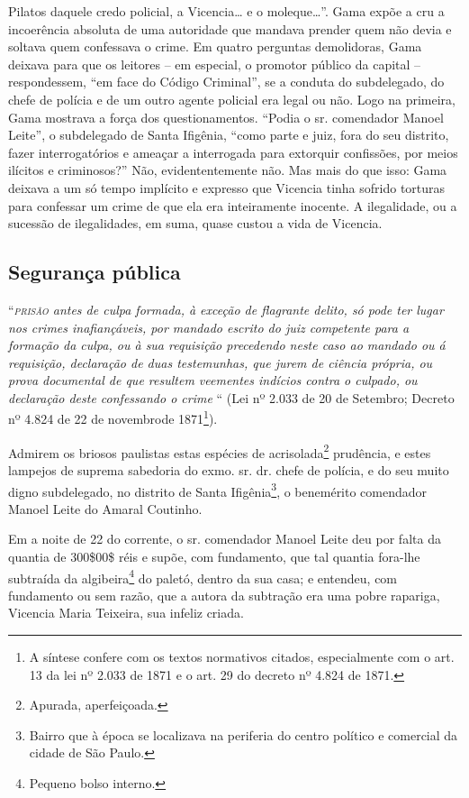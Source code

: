 {\begin{flushright}
\begin{didascalia}
{Pilatos daquele credo policial, a Vicencia\ldots{} e o moleque\ldots{}''. Gama
expõe a cru a incoerência absoluta de uma autoridade que mandava prender
quem não devia e soltava quem confessava o crime. Em quatro perguntas
demolidoras, Gama deixava para que os leitores -- em especial, o
promotor público da capital -- respondessem, ``em face do Código
Criminal'', se a conduta do subdelegado, do chefe de polícia e de um
outro agente policial era legal ou não. Logo na primeira, Gama mostrava
a força dos questionamentos. ``Podia o sr. comendador Manoel Leite'', o
subdelegado de Santa Ifigênia, ``como parte e juiz, fora do seu distrito,
fazer interrogatórios e ameaçar a interrogada para extorquir confissões,
por meios ilícitos e criminosos?'' Não, evidententemente não. Mas mais do
que isso: Gama deixava a um só tempo implícito e expresso que Vicencia
tinha sofrido torturas para confessar um crime de que ela era
inteiramente inocente. A ilegalidade, ou a sucessão de ilegalidades, em
suma, quase custou a vida de Vicencia.}
\end{didascalia}

\subsection{Segurança pública}

``\emph{\textsc{prisão} antes de culpa formada, à exceção de flagrante delito, só
pode ter lugar nos crimes inafiançáveis, por mandado escrito do juiz
competente para a formação da culpa, ou à sua requisição precedendo
neste caso ao mandado ou á requisição, declaração de duas testemunhas,
que jurem de ciência própria, ou prova documental de que resultem
veementes indícios contra o culpado, ou declaração deste confessando o
crime} `` (Lei nº 2.033 de 20 de Setembro; Decreto nº 4.824 de 22 de
novembrode 1871\footnote{ A síntese confere com os textos normativos
  citados, especialmente com o art. 13 da lei nº 2.033 de 1871 e o art.
  29 do decreto nº 4.824 de 1871.}).

Admirem os briosos paulistas estas espécies de acrisolada\footnote{
  Apurada, aperfeiçoada.} prudência, e estes lampejos de suprema
sabedoria do exmo. sr. dr. chefe de polícia, e do seu muito digno
subdelegado, no distrito de Santa Ifigênia\footnote{ Bairro que à época
  se localizava na periferia do centro político e comercial da cidade de
  São Paulo.}, o benemérito comendador Manoel Leite do Amaral Coutinho.

Em a noite de 22 do corrente, o sr. comendador Manoel Leite deu por
falta da quantia de 300\$00\$ réis e supõe, com fundamento, que tal
quantia fora-lhe subtraída da algibeira\footnote{ Pequeno bolso
  interno.} do paletó, dentro da sua casa; e entendeu, com fundamento ou
sem razão, que a autora da subtração era uma pobre rapariga, Vicencia
Maria Teixeira, sua infeliz criada.


\end{flushright}}
